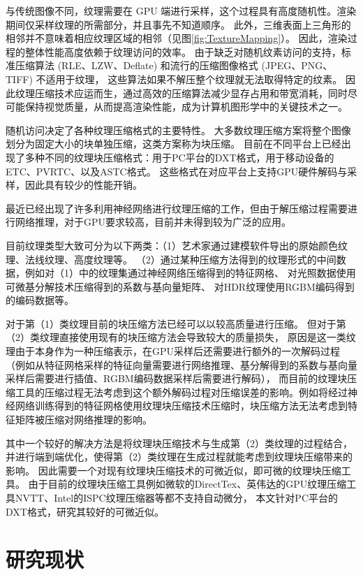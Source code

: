与传统图像不同，纹理需要在 GPU 端进行采样，这个过程具有高度随机性。渲染期间仅采样纹理的所需部分，并且事先不知道顺序。
此外，三维表面上三角形的相邻并不意味着相应纹理区域的相邻（见图\ref{fig:TextureMapping}）。
因此，渲染过程的整体性能高度依赖于纹理访问的效率。
由于缺乏对随机纹素访问的支持，标准压缩算法 (RLE、LZW、Deflate) 和流行的压缩图像格式 (JPEG、PNG、TIFF) 不适用于纹理，
这些算法如果不解压整个纹理就无法取得特定的纹素。
因此纹理压缩技术应运而生，通过高效的压缩算法减少显存占用和带宽消耗，同时尽可能保持视觉质量，从而提高渲染性能，成为计算机图形学中的关键技术之一。

随机访问决定了各种纹理压缩格式的主要特性。
大多数纹理压缩方案将整个图像划分为固定大小的块单独压缩，这类方案称为块压缩。
目前在不同平台上已经出现了多种不同的纹理块压缩格式：用于PC平台的DXT格式，用于移动设备的ETC、PVRTC、以及ASTC格式。
这些格式在对应平台上支持GPU硬件解码与采样，因此具有较少的性能开销。

最近已经出现了许多利用神经网络进行纹理压缩的工作，但由于解压缩过程需要进行网络推理，对于GPU要求较高，目前并未得到较为广泛的应用。

目前纹理类型大致可分为以下两类：（1）艺术家通过建模软件导出的原始颜色纹理、法线纹理、高度纹理等。
（2）通过某种压缩方法得到的纹理形式的中间数据，例如对（1）中的纹理集通过神经网络压缩得到的特征网格、
对光照数据使用可微基分解技术压缩得到的系数与基向量矩阵、
对HDR纹理使用RGBM编码得到的编码数据等。

对于第（1）类纹理目前的块压缩方法已经可以以较高质量进行压缩。
但对于第（2）类纹理直接使用现有的块压缩方法会导致较大的质量损失，
原因是这一类纹理由于本身作为一种压缩表示，在GPU采样后还需要进行额外的一次解码过程（例如从特征网格采样的特征向量需要进行网络推理、基分解得到的系数与基向量采样后需要进行插值、RGBM编码数据采样后需要进行解码），
而目前的纹理块压缩工具的压缩过程无法考虑到这个额外解码过程对压缩误差的影响。例如将经过神经网络训练得到的特征网格使用纹理块压缩技术压缩时，块压缩方法无法考虑到特征矩阵被压缩对网络推理的影响。

其中一个较好的解决方法是将纹理块压缩技术与生成第（2）类纹理的过程结合，并进行端到端优化，使得第（2）类纹理在生成过程就能考虑到纹理块压缩带来的影响。
因此需要一个对现有纹理块压缩技术的可微近似，即可微的纹理块压缩工具。
由于目前的纹理块压缩工具例如微软的DirectTex、英伟达的GPU纹理压缩工具NVTT、Intel的ISPC纹理压缩器等都不支持自动微分，
本文针对PC平台的DXT格式，研究其较好的可微近似。


\section{研究现状}

